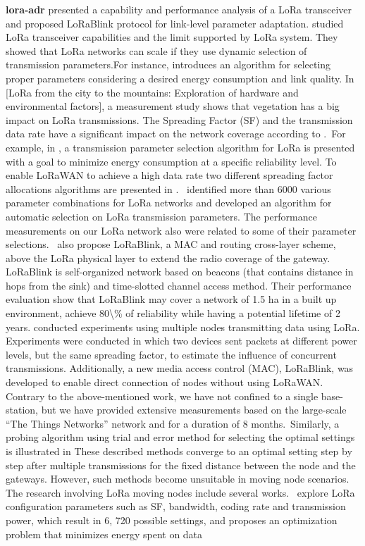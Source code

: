 \textbf{lora-adr} \newline  \cite{bor_lora_2017}   \citet{bor_lora_2017} presented a capability and performance analysis of a LoRa transceiver and proposed LoRaBlink protocol for link-level parameter adaptation.\citet{bor_lora_2016} studied LoRa transceiver capabilities and the limit supported by LoRa system. They showed that LoRa networks can scale if they use dynamic selection of transmission parameters.For instance, \cite{bor_lora_2017} introduces an algorithm for selecting proper parameters considering a desired energy consumption and link quality. In [LoRa from the city to the mountains: Exploration of hardware and environmental factors], a measurement study shows that vegetation has a big impact on LoRa transmissions. The Spreading Factor (SF) and the transmission data rate have a significant impact on the network coverage according to \cite{augustin_study_2016}.~For example, in \cite{bor_lora_2017}, a transmission parameter selection algorithm for LoRa is presented with a goal to minimize energy consumption at a specific reliability level. To enable LoRaWAN to achieve a high data rate two different spreading factor allocations algorithms are presented in \cite{cuomo_explora_2017}.~\citet{bor_lora_2017} identified more than 6000 various parameter combinations for LoRa networks and developed an algorithm for automatic selection on LoRa transmission parameters. The performance measurements on our LoRa network also were related to some of their parameter selections.~\citet{bor_lora_nodate} also propose LoRaBlink, a MAC and routing cross-layer scheme, above the LoRa physical layer to extend the radio coverage of the gateway. LoRaBlink is self-organized network based on beacons (that contains distance in hops from the sink) and time-slotted channel access method. Their performance evaluation show that LoRaBlink may cover a network of 1.5 ha in a built up environment, achieve 80\textbackslash\% of reliability while having a potential lifetime of 2 years.\citet{bor_lora_nodate} conducted experiments using multiple nodes transmitting data using LoRa. Experiments were conducted in which two devices sent packets at different power levels, but the same spreading factor, to estimate the influence of concurrent transmissions. Additionally, a new media access control (MAC), LoRaBlink, was developed to enable direct connection of nodes without using LoRaWAN. Contrary to the above-mentioned work, we have not confined to a single base-station, but we have provided extensive measurements based on the large-scale ``The Things Networks'' network and for a duration of 8 months.~Similarly, a probing algorithm using trial and error method for selecting the optimal settings is illustrated in \cite{bor_lora_2017} These described methods converge to an optimal setting step by step after multiple transmissions for the fixed distance between the node and the gateways. However, such methods become unsuitable in moving node scenarios. The research involving LoRa moving nodes include several works.~\citet{bor_lora_2017} explore LoRa configuration parameters such as SF, bandwidth, coding rate and transmission power, which result in 6, 720 possible settings, and proposes an optimization problem that minimizes energy spent on data 